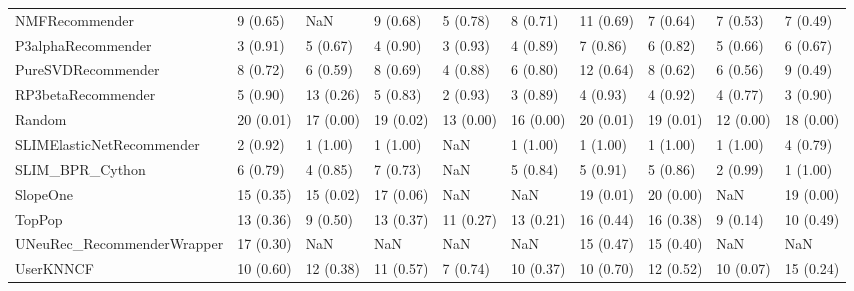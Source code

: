 \begin{tabular}{llllllllll}
                     NMFRecommender &                 9 (0.65) &         NaN &      9 (0.68) &     5 (0.78) &             8 (0.71) &           11 (0.69) &          7 (0.64) &           7 (0.53) &          7 (0.49) \\
                 P3alphaRecommender &                 3 (0.91) &    5 (0.67) &      4 (0.90) &     3 (0.93) &             4 (0.89) &            7 (0.86) &          6 (0.82) &           5 (0.66) &          6 (0.67) \\
                 PureSVDRecommender &                 8 (0.72) &    6 (0.59) &      8 (0.69) &     4 (0.88) &             6 (0.80) &           12 (0.64) &          8 (0.62) &           6 (0.56) &          9 (0.49) \\
                 RP3betaRecommender &                 5 (0.90) &   13 (0.26) &      5 (0.83) &     2 (0.93) &             3 (0.89) &            4 (0.93) &          4 (0.92) &           4 (0.77) &          3 (0.90) \\
                             Random &                20 (0.01) &   17 (0.00) &     19 (0.02) &    13 (0.00) &            16 (0.00) &           20 (0.01) &         19 (0.01) &          12 (0.00) &         18 (0.00) \\
          SLIMElasticNetRecommender &                 2 (0.92) &    1 (1.00) &      1 (1.00) &          NaN &             1 (1.00) &            1 (1.00) &          1 (1.00) &           1 (1.00) &          4 (0.79) \\
                    SLIM\_BPR\_Cython &                 6 (0.79) &    4 (0.85) &      7 (0.73) &          NaN &             5 (0.84) &            5 (0.91) &          5 (0.86) &           2 (0.99) &          1 (1.00) \\
                           SlopeOne &                15 (0.35) &   15 (0.02) &     17 (0.06) &          NaN &                  NaN &           19 (0.01) &         20 (0.00) &                NaN &         19 (0.00) \\
                             TopPop &                13 (0.36) &    9 (0.50) &     13 (0.37) &    11 (0.27) &            13 (0.21) &           16 (0.44) &         16 (0.38) &           9 (0.14) &         10 (0.49) \\
         UNeuRec\_RecommenderWrapper &                17 (0.30) &         NaN &           NaN &          NaN &                  NaN &           15 (0.47) &         15 (0.40) &                NaN &               NaN \\
                          UserKNNCF &                10 (0.60) &   12 (0.38) &     11 (0.57) &     7 (0.74) &            10 (0.37) &           10 (0.70) &         12 (0.52) &          10 (0.07) &         15 (0.24) \\
\bottomrule
\end{tabular}
